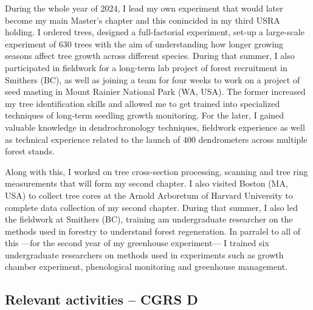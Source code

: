\documentclass{article}
\begin{document}
During the whole year of 2024, I lead my own experiment that would later become my main Master's chapter and this conincided in my third USRA holding. I ordered trees, designed a full-factorial experiment, set-up a large-scale experiment of 630 trees with the aim of understanding how longer growing seasons affect tree growth across different species. During that summer, I also participated in fieldwork for a long-term lab project of forest recruitment in Smithers (BC), as well as joining a team for four weeks to work on a project of seed masting in Mount Rainier National Park (WA, USA). The former increased my tree identification skills and allowed me to get trained into specialized techniques of long-term seedling growth monitoring. For the later, I gained valuable knowledge in dendrochronology techniques, fieldwork experience as well as technical experience related to the launch of 400 dendrometers across multiple forest stands. 

Along with this, I worked on tree cross-section processing, scanning and tree ring measurements that will form my second chapter. I also visited Boston (MA, USA) to collect tree cores at the Arnold Arboretum of Harvard University to complete data collection of my second chapter. During that summer, I also led the fieldwork at Smithers (BC), training am undergraduate researcher on the methods used in forestry to understand forest regeneration. In parralel to all of this ---for the second year of my greenhouse experiment--- I trained six undergraduate researchers on methods used in experiments such as growth chamber experiment, phenological monitoring and greenhouse management. 

\subsection*{Relevant activities – CGRS D}
\end{document}
